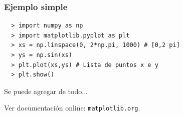 \documentclass[14pt,aspectratio=169,xcolor=dvipsnames]{beamer}
\begin{document}
\begin{frame}
{    }
\end{frame}
\begin{frame}[fragile]\frametitle{Ejemplo simple}
    \begin{verbatim}
  > import numpy as np
  > import matplotlib.pyplot as plt
  > xs = np.linspace(0, 2*np.pi, 1000) # [0,2 pi]
  > ys = np.sin(xs)
  > plt.plot(xs,ys) # Lista de puntos x e y
  > plt.show()
    \end{verbatim} 
   
    \pause Se puede agregar de todo... 

    Ver documentación online: \texttt{matplotlib.org}.
\end{frame}
\end{document}
